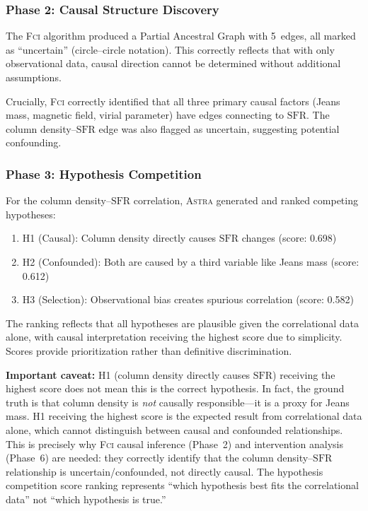 \documentclass[fleqn,usenatbib]{mnras}
\newcommand{\astra}{\textsc{Astra}\xspace}
\newcommand{\fci}{\textsc{Fci}\xspace}
\newcommand{\sfr}{\mathrm{SFR}}
\begin{document}
\subsubsection{Phase 2: Causal Structure Discovery}
\label{sec:tc6:phase2}

The \fci algorithm produced a Partial Ancestral Graph with 5~edges, all marked as ``uncertain'' (circle--circle notation).
This correctly reflects that with only observational data, causal direction cannot be determined without additional assumptions.

Crucially, \fci correctly identified that all three primary causal factors (Jeans mass, magnetic field, virial parameter) have edges connecting to $\sfr$.
The column density--$\sfr$ edge was also flagged as uncertain, suggesting potential confounding.

\subsubsection{Phase 3: Hypothesis Competition}
\label{sec:tc6:phase3}

For the column density--$\sfr$ correlation, \astra generated and ranked competing hypotheses:
\begin{enumerate}
  \item[(i)] H1 (Causal): Column density directly causes $\sfr$ changes (score: 0.698)
  \item[(ii)] H2 (Confounded): Both are caused by a third variable like Jeans mass (score: 0.612)
  \item[(iii)] H3 (Selection): Observational bias creates spurious correlation (score: 0.582)
\end{enumerate}

The ranking reflects that all hypotheses are plausible given the correlational data alone, with causal interpretation receiving the highest score due to simplicity.
Scores provide prioritization rather than definitive discrimination.

\textbf{Important caveat:}
H1 (column density directly causes $\sfr$) receiving the highest score does not mean this is the correct hypothesis.
In fact, the ground truth is that column density is \emph{not} causally responsible---it is a proxy for Jeans mass.
H1 receiving the highest score is the expected result from correlational data alone, which cannot distinguish between causal and confounded relationships.
This is precisely why \fci causal inference (Phase~2) and intervention analysis (Phase~6) are needed: they correctly identify that the column density--$\sfr$ relationship is uncertain/confounded, not directly causal.
The hypothesis competition score ranking represents ``which hypothesis best fits the correlational data'' not ``which hypothesis is true.''
\end{document}
